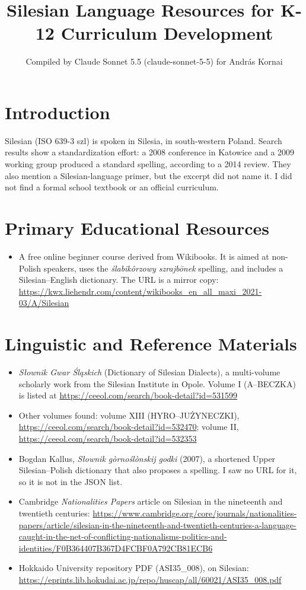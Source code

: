 \documentclass[12pt]{article}
\title{Silesian Language Resources for K-12 Curriculum Development}
\author{Compiled by Claude Sonnet 5.5 (claude-sonnet-5-5) for Andr\'as Kornai}
\date{}
\begin{document}
\maketitle

\section{Introduction}
Silesian (ISO 639-3 szl) is spoken in Silesia, in south-western Poland. Search results show a standardization effort: a 2008 conference in Katowice and a 2009 working group produced a standard spelling, according to a 2014 review. They also mention a Silesian-language primer, but the excerpt did not name it. I did not find a formal school textbook or an official curriculum.

\section{Primary Educational Resources}
\begin{itemize}
\item A free online beginner course derived from Wikibooks. It is aimed at non-Polish speakers, uses the \emph{\'slabik\^orzowy szrajb\={o}nek} spelling, and includes a Silesian--English dictionary. The URL is a mirror copy: \url{https://kwx.liehendr.com/content/wikibooks_en_all_maxi_2021-03/A/Silesian}
\end{itemize}

\section{Linguistic and Reference Materials}
\begin{itemize}
\item \emph{S\l ownik Gwar \'Sl\k askich} (Dictionary of Silesian Dialects), a multi-volume scholarly work from the Silesian Institute in Opole. Volume I (A--BECZKA) is listed at \url{https://ceeol.com/search/book-detail?id=531599}
\item Other volumes found: volume XIII (HYRO--JU\.ZYNECZKI), \url{https://ceeol.com/search/book-detail?id=532470}; volume II, \url{https://ceeol.com/search/book-detail?id=532353}
\item Bogdan Kallus, \emph{S\l ownik g\`orno\'sl\`onskij godki} (2007), a shortened Upper Silesian--Polish dictionary that also proposes a spelling. I saw no URL for it, so it is not in the JSON list.
\item Cambridge \emph{Nationalities Papers} article on Silesian in the nineteenth and twentieth centuries: \url{https://www.cambridge.org/core/journals/nationalities-papers/article/silesian-in-the-nineteenth-and-twentieth-centuries-a-language-caught-in-the-net-of-conflicting-nationalisms-politics-and-identities/F0B364407B367D4FCBF0A792CB81ECB6}
\item Hokkaido University repository PDF (ASI35\_008), on Silesian: \url{https://eprints.lib.hokudai.ac.jp/repo/huscap/all/60021/ASI35_008.pdf}
\end{itemize}
\end{document}
